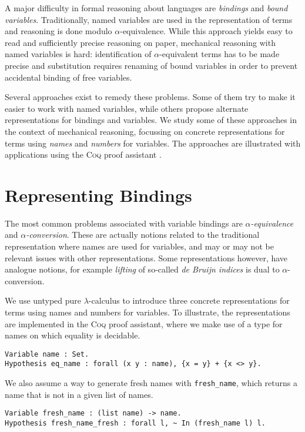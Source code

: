 \documentclass[a4paper,11pt]{article}
\newcommand{\name}[1]{\textsc{#1}\xspace}
\def\Coq{\name{Coq}}
\begin{document}
A major difficulty in formal reasoning about languages are {\em bindings}
and {\em bound variables}.
Traditionally, named variables are used in the representation of terms
and reasoning is done modulo $\alpha$-equivalence.
While this approach yields easy to read and sufficiently precise
reasoning on paper,
mechanical reasoning with named variables is hard:
identification of $\alpha$-equivalent terms has to be made precise and
substitution requires renaming of bound variables in order to prevent
accidental binding of free variables.

Several approaches exist to remedy these problems.
Some of them try to make it easier to work with named variables, while
others propose alternate representations for bindings and variables.
We study some of these approaches in the context of mechanical
reasoning, focussing on concrete representations for terms using
{\em names} and {\em numbers} for variables.
The approaches are illustrated with applications using the \Coq proof
assistant \cite{coq-refman-09,bertot-casteran-04}.


\section{Representing Bindings}\label{sec:representing}

The most common problems associated with variable bindings are
{\em $\alpha$-equivalence} and {\em $\alpha$-conversion}.
These are actually notions related to the traditional representation where
names are used for variables, and may or may not be relevant issues with
other representations.
Some representations however, have analogue notions, for example {\em lifting}
of so-called {\em de Bruijn indices} is dual to $\alpha$-conversion.

We use untyped pure $\lambda$-calculus \cite{barendregt-84} to introduce
three concrete representations for terms using names and numbers for
variables. To illustrate, the representations are implemented in the
\Coq proof assistant, where we make use of a type for names on which
equality is decidable.
\begin{lstlisting}
Variable name : Set.
Hypothesis eq_name : forall (x y : name), {x = y} + {x <> y}.
\end{lstlisting}
We also assume a way to generate fresh names with \lstinline{fresh_name},
which returns a name that is not in a given list of names.
\begin{lstlisting}
Variable fresh_name : (list name) -> name.
Hypothesis fresh_name_fresh : forall l, ~ In (fresh_name l) l.
\end{lstlisting}
\end{document}
